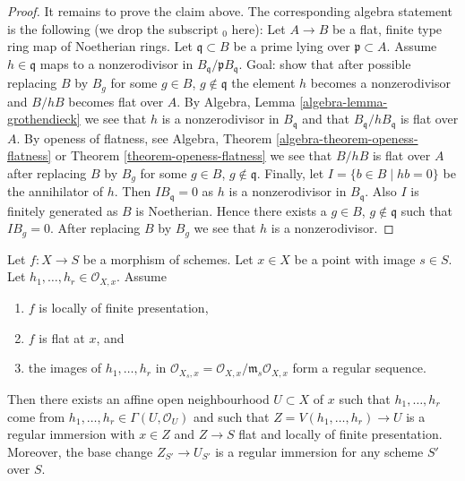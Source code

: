 \begin{proof}
\medskip\noindent
It remains to prove the claim above. The corresponding algebra statement
is the following (we drop the subscript ${}_0$ here):
Let $A \to B$ be a flat, finite type ring map of Noetherian rings.
Let $\mathfrak q \subset B$ be a prime lying over $\mathfrak p \subset A$.
Assume $h \in \mathfrak q$ maps to a nonzerodivisor in
$B_{\mathfrak q}/\mathfrak p B_{\mathfrak q}$.
Goal: show that after possible replacing $B$ by $B_g$ for some
$g \in B$, $g \not \in \mathfrak q$ the element $h$ becomes a nonzerodivisor
and $B/hB$ becomes flat over $A$. By
Algebra, Lemma \ref{algebra-lemma-grothendieck}
we see that $h$ is a nonzerodivisor in $B_{\mathfrak q}$ and that
$B_{\mathfrak q}/hB_{\mathfrak q}$ is flat over $A$.
By openess of flatness, see
Algebra, Theorem \ref{algebra-theorem-openess-flatness}
or
Theorem \ref{theorem-openess-flatness}
we see that $B/hB$ is flat over $A$ after replacing $B$ by $B_g$ for some
$g \in B$, $g \not \in \mathfrak q$. Finally, let
$I = \{b \in B \mid hb = 0\}$ be the annihilator of $h$. Then
$IB_{\mathfrak q} = 0$ as $h$ is a nonzerodivisor in $B_{\mathfrak q}$.
Also $I$ is finitely generated as $B$ is Noetherian.
Hence there exists a $g \in B$, $g \not \in \mathfrak q$ such that $IB_g = 0$.
After replacing $B$ by $B_g$ we see that $h$ is a nonzerodivisor.
\end{proof}

\begin{lemma}
\label{lemma-slice-given-elements}
Let $f : X \to S$ be a morphism of schemes.
Let $x \in X$ be a point with image $s \in S$.
Let $h_1, \ldots, h_r \in \mathcal{O}_{X, x}$.
Assume
\begin{enumerate}
\item $f$ is locally of finite presentation,
\item $f$ is flat at $x$, and
\item the images of $h_1, \ldots, h_r$ in
$\mathcal{O}_{X_s, x} = \mathcal{O}_{X, x}/\mathfrak m_s\mathcal{O}_{X, x}$
form a regular sequence.
\end{enumerate}
Then there exists an affine open neighbourhood $U \subset X$ of $x$
such that $h_1, \ldots, h_r$ come from
$h_1, \ldots, h_r \in \Gamma(U, \mathcal{O}_U)$ and such
that $Z = V(h_1, \ldots, h_r) \to U$ is a regular immersion with
$x \in Z$ and $Z \to S$ flat and locally of finite presentation.
Moreover, the base change $Z_{S'} \to U_{S'}$ is a regular immersion
for any scheme $S'$ over $S$.
\end{lemma}

